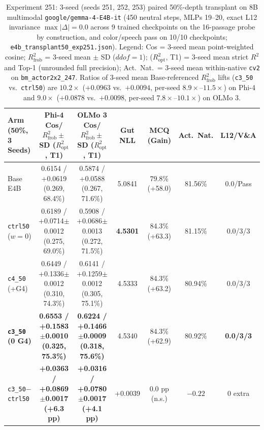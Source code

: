 \documentclass[conference]{IEEEtran}
\begin{document}
\begin{table}[t]
\centering
\caption{Experiment 251: 3-seed (seeds 251, 252, 253) paired 50\%-depth transplant on 8B multimodal \texttt{google/gemma-4-E4B-it} (450 neutral steps, MLPs 19--20, exact L12 invariance $\max|\Delta|=0.0$ across 9 trained checkpoints on the 16-passage probe by construction, and color/speech pass on 10/10 checkpoints; \texttt{e4b\_transplant50\_exp251.json}). Legend: Cos = 3-seed mean point-weighted cosine; $R^2_{\text{frob}}$ = 3-seed mean $\pm$ SD ($ddof=1$); ($R^2_{\text{opt}}$, T1) = 3-seed mean strict $R^2$ and Top-1 (unrounded full precision); Act.\ Nat.\ = 3-seed mean within-native \texttt{cv2} on \texttt{bm\_actor2x2\_247}. Ratios of 3-seed mean Base-referenced $R^2_{\text{frob}}$ lifts (\texttt{c3\_50} vs.\ \texttt{ctrl50}) are $10.2\times$ ($+0.0963$ vs.\ $+0.0094$, per-seed $8.9\times$--$11.5\times$) on Phi-4 and $9.0\times$ ($+0.0878$ vs.\ $+0.0098$, per-seed $7.8\times$--$10.1\times$) on OLMo 3.}
\label{tab:exp251}
\scriptsize
\setlength{\tabcolsep}{1.1pt}
\begin{tabular}{@{}lcccccc@{}}
\toprule
\textbf{Arm (50\%, 3 Seeds)} & \textbf{Phi-4 Cos/$R^2_{\text{frob}}\pm$SD ($R^2_{\text{opt}}$, T1)} & \textbf{OLMo 3 Cos/$R^2_{\text{frob}}\pm$SD ($R^2_{\text{opt}}$, T1)} & \textbf{Gut NLL} & \textbf{MCQ (Gain)} & \textbf{Act.\ Nat.} & \textbf{L12/V\&A} \\
\midrule
Base E4B & 0.6154 / +0.0619 (0.269, 68.4\%) & 0.5874 / +0.0588 (0.267, 71.6\%) & 5.0841 & 79.8\% (+58.0) & 81.56\% & 0.0/Pass \\
\texttt{ctrl50} ($w=0$) & 0.6189 / +0.0714$\pm$0.0012 (0.275, 69.0\%) & 0.5908 / +0.0686$\pm$0.0013 (0.272, 71.5\%) & \textbf{4.5301} & 84.3\% (+63.3) & 81.15\% & 0.0/3/3 \\
\texttt{c4\_50} (+G4) & 0.6449 / +0.1336$\pm$0.0012 (0.310, 74.3\%) & 0.6141 / +0.1259$\pm$0.0012 (0.305, 75.1\%) & 4.5333 & 84.3\% (+63.2) & 80.94\% & 0.0/3/3 \\
\textbf{\texttt{c3\_50} (0 G4)} & \textbf{0.6553 / +0.1583$\pm$0.0010 (0.325, 75.3\%)} & \textbf{0.6224 / +0.1466$\pm$0.0009 (0.318, 75.6\%)} & 4.5340 & 84.3\% (+62.9) & 80.92\% & \textbf{0.0/3/3} \\
\midrule
\texttt{c3\_50}$-$\texttt{ctrl50} & \textbf{+0.0363 / +0.0869$\pm$0.0017 (+6.3 pp)} & \textbf{+0.0316 / +0.0780$\pm$0.0017 (+4.1 pp)} & +0.0039 & 0.0 pp (n.s.) & $-0.22$ & 0 extra \\
\bottomrule
\end{tabular}
\end{table}
\end{document}
